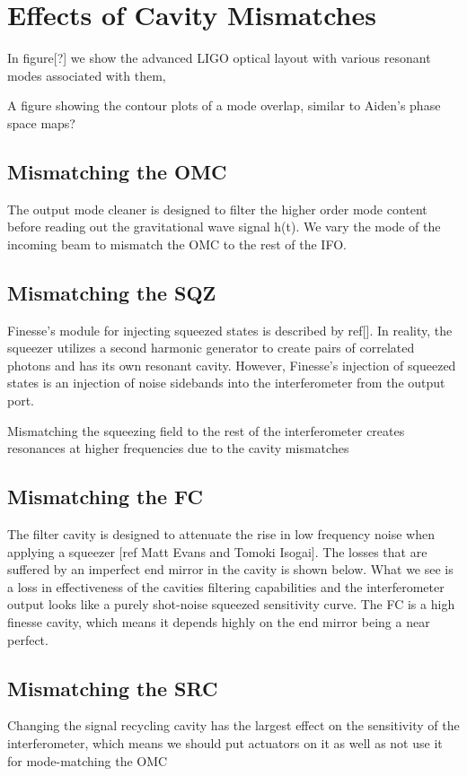 \documentclass[12pt]{iopart}
\begin{document}
\section{Effects of Cavity Mismatches}
In figure[?] we show the advanced LIGO optical layout with various resonant modes associated with them, 

A figure showing the contour plots of a mode overlap, similar to Aiden's phase space maps?

\subsection{Mismatching the OMC}
The output mode cleaner is designed to filter the higher order mode content before reading out the gravitational wave signal h(t).  We vary the mode of the incoming beam to mismatch the OMC to the rest of the IFO.

\subsection{Mismatching the SQZ}
Finesse's module for injecting squeezed states is described by ref[]. In reality, the squeezer utilizes a second harmonic generator to create pairs of correlated photons and has its own resonant cavity.  However, Finesse's injection of squeezed states is an injection of noise sidebands into the interferometer from the output port.

Mismatching the squeezing field to the rest of the interferometer creates resonances at higher frequencies due to the cavity mismatches 

\subsection{Mismatching the FC}
The filter cavity is designed to attenuate the rise in low frequency noise when applying a squeezer [ref Matt Evans and Tomoki Isogai].  The losses that are suffered by an imperfect end mirror in the cavity is shown below.  What we see is a loss in effectiveness of the cavities filtering capabilities and the interferometer output looks like a purely shot-noise squeezed sensitivity curve. The FC is a high finesse cavity, which means it depends highly on the end mirror being a near perfect.

\subsection{Mismatching the SRC}
Changing the signal recycling cavity has the largest effect on the sensitivity of the interferometer, which means we should put actuators on it as well as not use it for mode-matching the OMC
\end{document}
